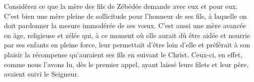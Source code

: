 Considérez ce que la mère des fils de Zébédée demande avec eux et pour eux.
C’est bien une mère pleine de sollicitude pour l’honneur de ses fils,
	à laquelle on doit pardonner la mesure immodérée de ses vœux.
C’est aussi une mère avancée en âge, religieuse et zélée
	qui, à ce moment où elle aurait dû être aidée et nourrie
		par ses enfants en pleine force,
	leur permettait d’être loin d’elle
	et préférait à son plaisir
		la récompense qu’auraient ses fils en suivant le Christ.
Ceux-ci, en effet, comme nous l’avons lu, dès le premier appel,
	ayant laissé leurs filets et leur père, avaient suivi le Seigneur.
